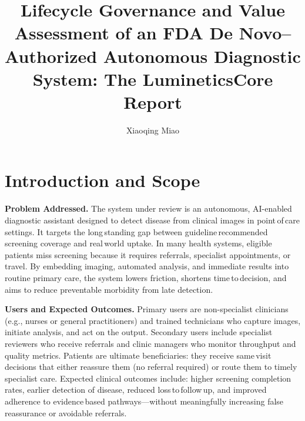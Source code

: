 \documentclass[sigplan,screen]{acmart}
\begin{document}
\title[LumineticsCore Report]{Lifecycle Governance and Value Assessment of an FDA De Novo--Authorized Autonomous Diagnostic System: The LumineticsCore Report}
\author{Xiaoqing Miao}
\renewcommand{\shortauthors}{Xiaoqing Miao}
\maketitle

\section{Introduction and Scope}
\textbf{Problem Addressed.} The system under review is an autonomous, AI-enabled diagnostic assistant designed to detect disease from clinical images in point\,of\,care settings. It targets the long\,standing gap between guideline\,recommended screening coverage and real\,world uptake. In many health systems, eligible patients miss screening because it requires referrals, specialist appointments, or travel. By embedding imaging, automated analysis, and immediate results into routine primary care, the system lowers friction, shortens time\,to\,decision, and aims to reduce preventable morbidity from late detection\cite{wolf2024autonomous,fda2018denovo,digitaldiagnostics2024indications}.

\textbf{Users and Expected Outcomes.} Primary users are non-specialist clinicians (e.g., nurses or general practitioners) and trained technicians who capture images, initiate analysis, and act on the output. Secondary users include specialist reviewers who receive referrals and clinic managers who monitor throughput and quality metrics. Patients are ultimate beneficiaries: they receive same\,visit decisions that either reassure them (no referral required) or route them to timely specialist care. Expected clinical outcomes include: higher screening completion rates, earlier detection of disease, reduced loss\,to\,follow\,up, and improved adherence to evidence\,based pathways—without meaningfully increasing false reassurance or avoidable referrals\cite{wolf2024autonomous}.
\end{document}

